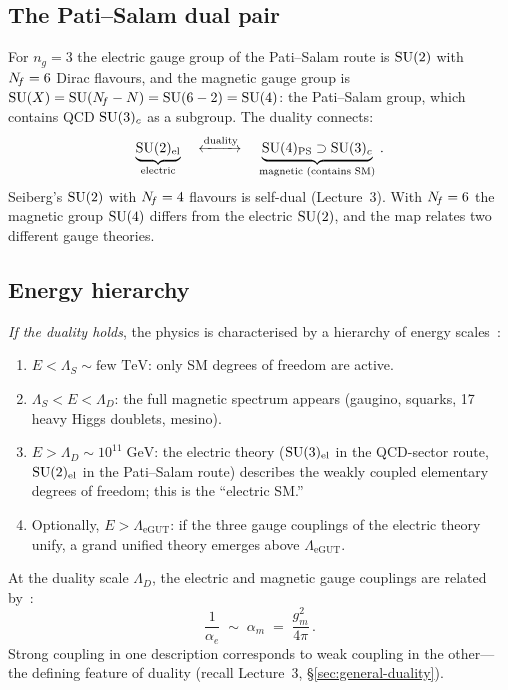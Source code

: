 \documentclass[11pt,a4paper]{article}
\begin{document}
\subsection{The Pati--Salam dual pair}

For $n_g = 3$ the electric gauge group of the Pati--Salam route is
$\mathrm{SU}(2)$ with $N_{\!f} = 6$ Dirac flavours, and the magnetic gauge group is
$\mathrm{SU}(X) = \mathrm{SU}(N_{\!f} - N) = \mathrm{SU}(6 - 2) = \mathrm{SU}(4)$: the Pati--Salam group,
which contains QCD $\mathrm{SU}(3)_c$ as a subgroup.  The duality connects:
\[
  \underbrace{\mathrm{SU}(2)_{\text{el}}}_{\text{electric}}
  \quad \xleftrightarrow{\text{duality}} \quad
  \underbrace{\mathrm{SU}(4)_{\text{PS}} \supset \mathrm{SU}(3)_c}_{\text{magnetic
  (contains SM)}}\,.
\]
Seiberg's $\mathrm{SU}(2)$ with $N_{\!f} = 4$ flavours is self-dual (Lecture~3).
With $N_{\!f} = 6$ the magnetic group $\mathrm{SU}(4)$ differs from the electric
$\mathrm{SU}(2)$, and the map relates two different gauge theories.

\subsection{Energy hierarchy}

\emph{If the duality holds}, the physics is characterised by a hierarchy
of energy scales~\cite{CacciapagliaSannino2024}:
\begin{enumerate}
  \item $E < \Lambda_S \sim \text{few TeV}$: only SM degrees of freedom
    are active.
  \item $\Lambda_S < E < \Lambda_D$: the full magnetic spectrum appears
    (gaugino, squarks, 17 heavy Higgs doublets, mesino).
  \item $E > \Lambda_D \sim 10^{11}\;\text{GeV}$: the electric theory
    ($\mathrm{SU}(3)_{\mathrm{el}}$ in the QCD-sector route,
    $\mathrm{SU}(2)_{\mathrm{el}}$ in the Pati--Salam route) describes the
    weakly coupled elementary degrees of freedom; this is the
    ``electric SM.''
  \item Optionally, $E > \Lambda_{\text{eGUT}}$: if the three gauge
    couplings of the electric theory unify, a grand unified theory
    emerges above $\Lambda_{\text{eGUT}}$.
\end{enumerate}
At the duality scale $\Lambda_D$, the electric and magnetic gauge
couplings are related by~\cite{CacciapagliaSannino2024}:
\begin{equation}\label{eq:coupling-match}
  \frac{1}{\alpha_e}
  \;\sim\; \alpha_m
  \;=\; \frac{g_m^2}{4\pi}\,.
\end{equation}
Strong coupling in one description corresponds to weak coupling in the
other---the defining feature of duality (recall Lecture~3,
\S\ref{sec:general-duality}).
\end{document}
